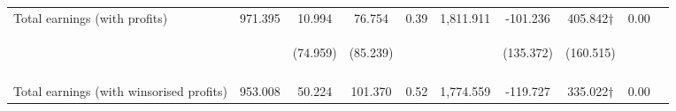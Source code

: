 \begin{tabular}{lccccccccc}
\noalign{\smallskip}Total earnings (with profits) & 971.395 & 10.994 & 76.754 & 0.39 & 1,811.911 & -101.236 & 405.842† & 0.00 & \\
 & \begin{footnotesize}\end{footnotesize} & \begin{footnotesize}(74.959)\end{footnotesize} & \begin{footnotesize}(85.239)\end{footnotesize} & \begin{footnotesize}\end{footnotesize} & \begin{footnotesize}\end{footnotesize} & \begin{footnotesize}(135.372)\end{footnotesize} & \begin{footnotesize}(160.515)\end{footnotesize} & \begin{footnotesize}\end{footnotesize} & \begin{footnotesize}\end{footnotesize}\\
 & \begin{footnotesize}\end{footnotesize} & \begin{footnotesize}[1.000]\end{footnotesize} & \begin{footnotesize}[1.000]\end{footnotesize} & \begin{footnotesize}\end{footnotesize} & \begin{footnotesize}\end{footnotesize} & \begin{footnotesize}[1.000]\end{footnotesize} & \begin{footnotesize}[0.023]\end{footnotesize} & \begin{footnotesize}\end{footnotesize} & \begin{footnotesize}\end{footnotesize}\\
\noalign{\smallskip}Total earnings (with winsorised profits) & 953.008 & 50.224 & 101.370 & 0.52 & 1,774.559 & -119.727 & 335.022† & 0.00 & \\

\end{tabular}
